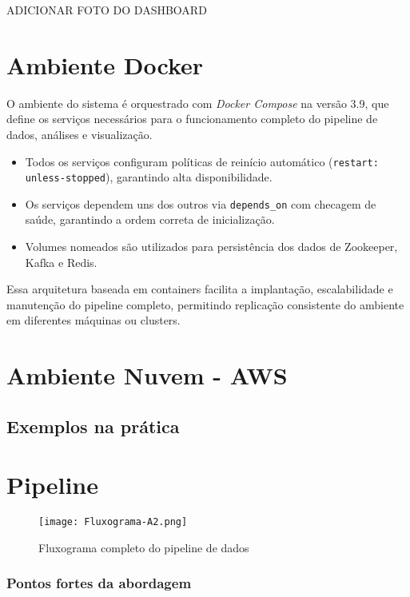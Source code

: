 \documentclass[a4paper,12pt]{article}
\begin{document}
ADICIONAR FOTO DO DASHBOARD


\section{Ambiente Docker}

O ambiente do sistema é orquestrado com \textit{Docker Compose} na versão 3.9, que define os serviços necessários para o funcionamento completo do pipeline de dados, análises e visualização.


\begin{itemize}
    \item Todos os serviços configuram políticas de reinício automático (\texttt{restart: unless-stopped}), garantindo alta disponibilidade.
    \item Os serviços dependem uns dos outros via \texttt{depends\_on} com checagem de saúde, garantindo a ordem correta de inicialização.
    \item Volumes nomeados são utilizados para persistência dos dados de Zookeeper, Kafka e Redis.
\end{itemize}

Essa arquitetura baseada em containers facilita a implantação, escalabilidade e manutenção do pipeline completo, permitindo replicação consistente do ambiente em diferentes máquinas ou clusters.


\section{Ambiente Nuvem - AWS}

\subsection*{Exemplos na prática}

\section{Pipeline}

\begin{figure}[H]
    \centering
    \texttt{[image: Fluxograma-A2.png]}
    \caption{Fluxograma completo do pipeline de dados}
    \label{fig:pipeline}
\end{figure}


\subsubsection*{Pontos fortes da abordagem}
\end{document}
